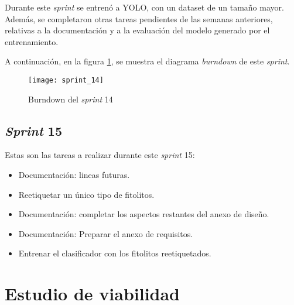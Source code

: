 Durante este \textit{sprint} se entrenó a YOLO, con un dataset de un tamaño mayor. Además, se completaron otras tareas pendientes de las semanas anteriores, relativas a la documentación y a la evaluación del modelo generado por el entrenamiento.

A continuación, en la figura \ref{fig:A.1.15}, se muestra el diagrama \textit{burndown} de este \textit{sprint}.

\begin{figure}
\centering
\texttt{[image: sprint\_14]}
\caption{Burndown del \textit{sprint} 14}
\label{fig:A.1.15}
\end{figure}

\subsection{\textit{Sprint} 15}

Estas son las tareas a realizar durante este \textit{sprint} 15:

\begin{itemize}
	\item Documentación: lineas futuras.
	\item Reetiquetar un único tipo de fitolitos.
	\item Documentación: completar los aspectos restantes del anexo de diseño.
	\item Documentación: Preparar el anexo de requisitos.
	\item Entrenar el clasificador con los fitolitos reetiquetados.
\end{itemize}

\begin{comment}
Durante este \textit{sprint} se entrenó a YOLO, con un dataset de un tamaño mayor. Además, se completaron otras tareas pendientes de las semanas anteriores, relativas a la documentación y a la evaluación del modelo generado por el entrenamiento.

A continuación, en la figura \ref{fig:A.1.17}, se muestra el diagrama \textit{burndown} de este \textit{sprint}.

\begin{figure}
\centering
\texttt{[image: sprint\_15]}
\caption{Burndown del \textit{sprint} 15}
\label{fig:A.1.17}
\end{figure}
\end{comment}

\section{Estudio de viabilidad}


